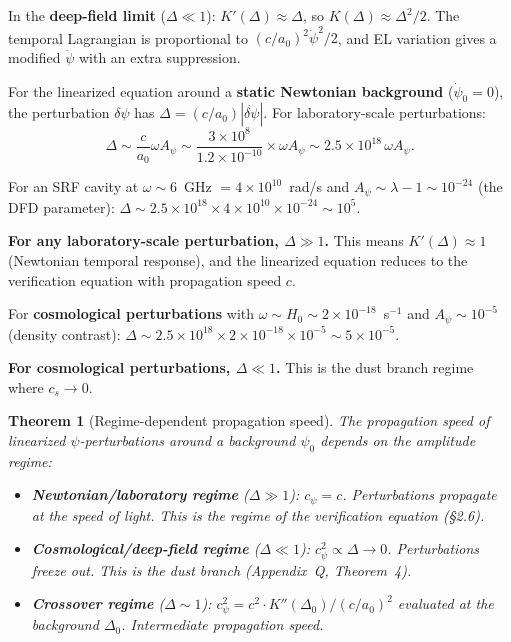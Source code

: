 \documentclass[11pt]{article}
\newtheorem{theorem}{Theorem}
\newcommand{\ee}[1]{\times 10^{#1}}
\begin{document}
In the \textbf{deep-field limit} ($\Delta \ll 1$): $K'(\Delta) \approx \Delta$,
so $K(\Delta) \approx \Delta^2/2$. The temporal Lagrangian is proportional
to $(c/a_0)^2\dot\psi^2/2$, and EL variation gives a modified $\ddot\psi$
with an extra suppression.

For the linearized equation around a \textbf{static Newtonian background}
($\dot\psi_0 = 0$), the perturbation $\delta\psi$ has
$\Delta = (c/a_0)|\dot{\delta\psi}|$. For laboratory-scale perturbations:
\begin{equation}
\Delta \sim \frac{c}{a_0}\omega A_\psi \sim \frac{3\ee{8}}{1.2\ee{-10}}
\times \omega A_\psi \sim 2.5\ee{18}\,\omega A_\psi.
\end{equation}

For an SRF cavity at $\omega \sim 6$~GHz $= 4\ee{10}$~rad/s and
$A_\psi \sim \lambda - 1 \sim 10^{-24}$ (the DFD parameter):
$\Delta \sim 2.5\ee{18} \times 4\ee{10} \times 10^{-24} \sim 10^5$.

\textbf{For any laboratory-scale perturbation, $\Delta \gg 1$.} This means
$K'(\Delta) \approx 1$ (Newtonian temporal response), and the linearized
equation reduces to the verification equation with propagation speed $c$.

For \textbf{cosmological perturbations} with $\omega \sim H_0 \sim 2\ee{-18}$~s$^{-1}$
and $A_\psi \sim 10^{-5}$ (density contrast):
$\Delta \sim 2.5\ee{18} \times 2\ee{-18} \times 10^{-5} \sim 5\ee{-5}$.

\textbf{For cosmological perturbations, $\Delta \ll 1$.} This is the dust
branch regime where $c_s \to 0$.

\begin{theorem}[Regime-dependent propagation speed]
\label{thm:cpsi-regimes}
The propagation speed of linearized $\psi$-perturbations around a
background $\psi_0$ depends on the amplitude regime:
\begin{itemize}
\item \textbf{Newtonian/laboratory regime} ($\Delta \gg 1$):
  $c_\psi = c$. Perturbations propagate at the speed of light.
  This is the regime of the verification equation (\S2.6).
\item \textbf{Cosmological/deep-field regime} ($\Delta \ll 1$):
  $c_\psi^2 \propto \Delta \to 0$. Perturbations freeze out.
  This is the dust branch (Appendix~Q, Theorem~4).
\item \textbf{Crossover regime} ($\Delta \sim 1$):
  $c_\psi^2 = c^2 \cdot K''(\Delta_0)/(c/a_0)^2$ evaluated at the
  background $\Delta_0$. Intermediate propagation speed.
\end{itemize}
\end{theorem}
\end{document}
